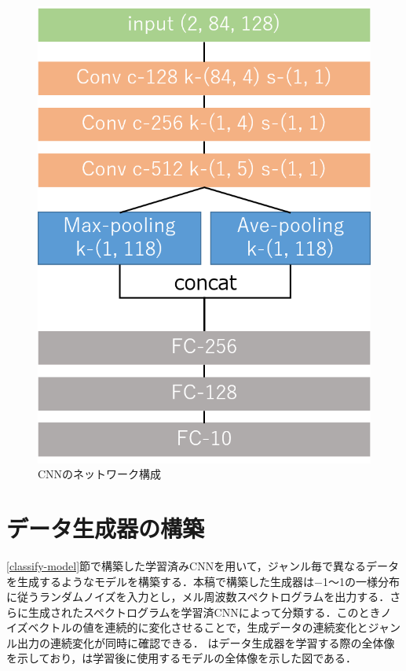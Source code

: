 \begin{figure}[htbp]
	\begin{center}
		\includegraphics[scale=0.425]{./images/classify-model/network.png}
		\caption{CNNのネットワーク構成}
		\label{fig:networkCNN}
	\end{center}
\end{figure}



\newpage
\section{データ生成器の構築}\label{generate-model}
\ref{classify-model}節で構築した学習済みCNNを用いて，ジャンル毎で異なるデータを生成するようなモデルを構築する．本稿で構築した生成器は$-$1～1の一様分布に従うランダムノイズを入力とし，メル周波数スペクトログラムを出力する．さらに生成されたスペクトログラムを学習済CNNによって分類する．このときノイズベクトルの値を連続的に変化させることで，生成データの連続変化とジャンル出力の連続変化が同時に確認できる．
はデータ生成器を学習する際の全体像を示しており，は学習後に使用するモデルの全体像を示した図である．

